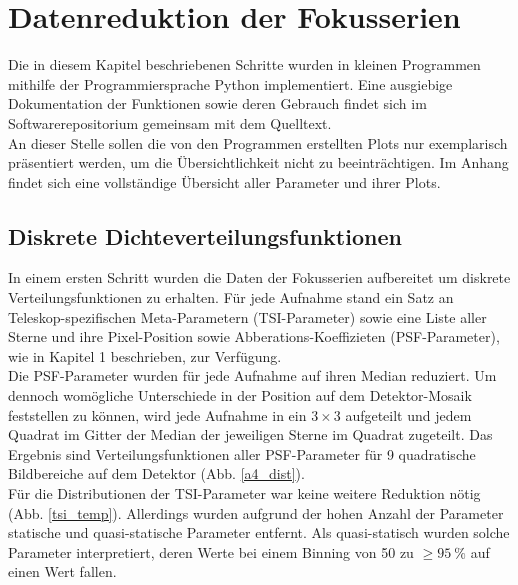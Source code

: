 \chapter{Datenreduktion der Fokusserien}
\label{chapter_2}
Die in diesem Kapitel beschriebenen Schritte wurden in kleinen Programmen mithilfe der Programmiersprache Python implementiert. Eine ausgiebige Dokumentation der Funktionen sowie deren Gebrauch findet sich im Softwarerepositorium gemeinsam mit dem Quelltext.\\
An dieser Stelle sollen die von den Programmen erstellten Plots nur exemplarisch präsentiert werden, um die Übersichtlichkeit nicht zu beeinträchtigen. Im Anhang findet sich eine vollständige Übersicht aller Parameter und ihrer Plots.

\section{Diskrete Dichteverteilungsfunktionen}
In einem ersten Schritt wurden die Daten der Fokusserien aufbereitet um diskrete Verteilungsfunktionen zu erhalten. Für jede Aufnahme stand ein Satz an Teleskop-spezifischen Meta-Parametern (TSI-Parameter) sowie eine Liste aller Sterne und ihre Pixel-Position sowie Abberations-Koeffizieten (PSF-Parameter), wie in Kapitel 1 beschrieben, zur Verfügung.\\
Die PSF-Parameter wurden für jede Aufnahme auf ihren Median reduziert. Um dennoch womögliche Unterschiede in der Position auf dem Detektor-Mosaik feststellen zu können, wird jede Aufnahme in ein $3\times 3$ aufgeteilt und jedem Quadrat im Gitter der Median der jeweiligen Sterne im Quadrat zugeteilt. Das Ergebnis sind Verteilungsfunktionen aller PSF-Parameter für 9 quadratische Bildbereiche auf dem Detektor (Abb. \ref{a4_dist}).\\
Für die Distributionen der TSI-Parameter war keine weitere Reduktion nötig (Abb. \ref{tsi_temp}). Allerdings wurden aufgrund der hohen Anzahl der Parameter statische und quasi-statische Parameter entfernt. Als quasi-statisch wurden solche Parameter interpretiert, deren Werte bei einem Binning von 50 zu $\ge\SI{95}{\percent}$ auf einen Wert fallen.
\vfill\,

